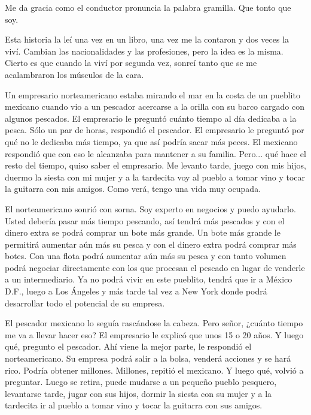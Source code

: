 \documentclass[12pt,twoside,openright,a5paper]{book}
\begin{document}
\begin{itemize}
Me da gracia como el conductor pronuncia la palabra gramilla.
Que tonto que soy.

\vspace{0.5cm}

\hrulefill\hspace{0.2cm} \decofourleft\decofourright \hspace{0.2cm} \hrulefill
\vspace{0.5cm}

Esta historia la leí una vez en un libro, una vez me la contaron y dos
veces la viví. Cambian las nacionalidades y las profesiones, pero la idea
es la misma. Cierto es que cuando la viví por segunda vez, sonreí tanto
que se me acalambraron los músculos de la cara.

Un empresario norteamericano estaba mirando el mar en la costa de un
pueblito mexicano cuando vio a un pescador acercarse a la orilla con
su barco cargado con algunos pescados. El empresario le preguntó cuánto
tiempo al día dedicaba a la pesca. Sólo un par de horas, respondió el
pescador. El empresario le preguntó por qué no le dedicaba más tiempo,
ya que así podría sacar más peces. El mexicano respondió que con eso
le alcanzaba para mantener a su familia. Pero... qué hace el resto del
tiempo, quiso saber el empresario. Me levanto tarde, juego con mis hijos,
duermo la siesta con mi mujer y a la tardecita voy al pueblo a tomar vino
y tocar la guitarra con mis amigos. Como verá, tengo una vida muy ocupada.

El norteamericano sonrió con sorna. Soy experto en negocios y puedo
ayudarlo. Usted debería pasar más tiempo pescando, así tendrá más
pescados y con el dinero extra se podrá comprar un bote más grande. Un
bote más grande le permitirá aumentar aún más su pesca y con el dinero
extra podrá comprar más botes. Con una flota podrá aumentar aún más su
pesca y con tanto volumen podrá negociar directamente con los que procesan
el pescado en lugar de venderle a un intermediario. Ya no podrá vivir en
este pueblito, tendrá que ir a México D.F., luego a Los Ángeles y más tarde
tal vez a New York donde podrá desarrollar todo el potencial de su empresa.

El pescador mexicano lo seguía rascándose la cabeza. Pero señor, ¿cuánto
tiempo me va a llevar hacer eso? El empresario le explicó que unos 15 o
20 años. Y luego qué, pregunto el pescador. Ahí viene la mejor parte,
le respondió el norteamericano. Su empresa podrá salir a la bolsa,
venderá acciones y se hará rico. Podría obtener millones. Millones,
repitió el mexicano. Y luego qué, volvió a preguntar. Luego se retira,
puede mudarse a un pequeño pueblo pesquero, levantarse tarde, jugar con
sus hijos, dormir la siesta con su mujer y a la tardecita ir al pueblo a
tomar vino y tocar la guitarra con sus amigos.


\end{itemize}
\end{document}
